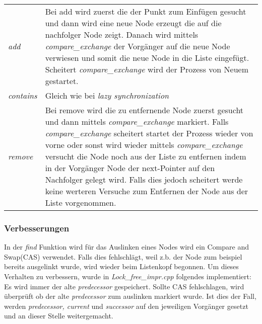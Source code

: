 \begin{table}[H]
    \begin{tabularx}{\textwidth}{lX}
        \textit{add} & Bei add wird zuerst die der Punkt zum Einfügen gesucht und dann wird eine neue Node erzeugt die auf die nachfolger Node zeigt. Danach wird mittels \textit{compare\_exchange} der Vorgänger auf die neue Node verwiesen und somit die neue Node in die Liste eingefügt. Scheitert \textit{compare\_exchange} wird der Prozess von Neuem gestartet. \\
        \textit{contains} & Gleich wie bei \textit{lazy synchronization} \\
        \textit{remove} & Bei remove wird die zu entfernende Node zuerst gesucht und dann mittels \textit{compare\_exchange} markiert. Falls \textit{compare\_exchange} scheitert startet der Prozess wieder von vorne oder sonst wird wieder mittels \textit{compare\_exchange} versucht die Node noch aus der Liste zu entfernen indem in der Vorgänger Node der next-Pointer auf den Nachfolger gelegt wird. Falls dies jedoch scheitert werde keine werteren Versuche zum Entfernen der Node aus der Liste vorgenommen. \\
    \end{tabularx}
\end{table}

\subsubsection{Verbesserungen}
\label{subsec:impr}
In der \textit{find} Funktion wird für das Auslinken eines Nodes wird ein Compare and Swap(CAS) verwendet. Falls dies fehlschlägt, 
weil z.b. der Node zum beispiel bereits ausgelinkt wurde,
wird wieder beim Listenkopf begonnen. Um dieses Verhalten zu verbessern, wurde in \textit{Lock\_free\_impr.cpp} folgendes implementiert:\\
Es wird immer der alte \textit{predecessor} gespeichert. Sollte CAS fehlschlagen, wird überprüft ob der alte \textit{predecessor}
zum auslinken markiert wurde. Ist dies der Fall, werden \textit{predecessor, current} und \textit{successor} auf den jeweiligen Vorgänger
gesetzt und an dieser Stelle weitergemacht. 